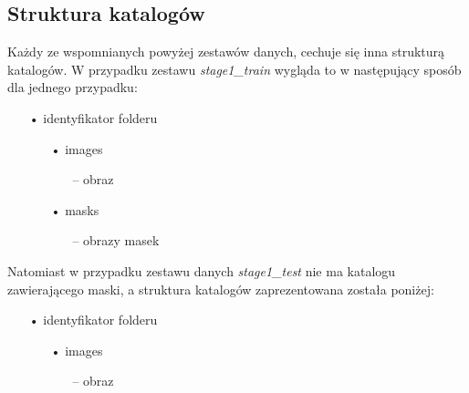 \documentclass[a4paper]{article}
\begin{document}
\subsection{Struktura katalogów}
Każdy ze wspomnianych powyżej zestawów danych, cechuje się inna strukturą katalogów. W przypadku zestawu \textit{stage1\_train} wygląda to w następujący sposób dla jednego przypadku:
\begin{itemize}
    \item[•] identyfikator folderu
    \begin{itemize}
        \item[•] images
        \begin{itemize}
            \item[--] obraz
        \end{itemize}
        \item[•] masks
        \begin{itemize}
            \item[--] obrazy masek
        \end{itemize}
    \end{itemize}
\end{itemize}
Natomiast w przypadku zestawu danych \textit{stage1\_test} nie ma katalogu zawierającego maski, a struktura katalogów zaprezentowana została poniżej:
\begin{itemize}
    \item[•] identyfikator folderu
    \begin{itemize}
        \item[•] images
        \begin{itemize}
            \item[--] obraz
        \end{itemize}
    \end{itemize}
\end{itemize}
\newpage
\end{document}
